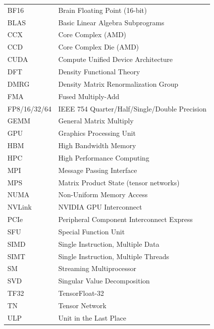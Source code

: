 \begin{tabular}{@{}ll@{}}
  BF16       & Brain Floating Point (16-bit) \\
  BLAS       & Basic Linear Algebra Subprograms \\
  CCX        & Core Complex (AMD) \\
  CCD        & Core Complex Die (AMD) \\
  CUDA       & Compute Unified Device Architecture \\
  DFT        & Density Functional Theory \\
  DMRG       & Density Matrix Renormalization Group \\
  FMA        & Fused Multiply-Add \\
  FP8/16/32/64 & IEEE 754 Quarter/Half/Single/Double Precision \\
  GEMM       & General Matrix Multiply \\
  GPU        & Graphics Processing Unit \\
  HBM        & High Bandwidth Memory \\
  HPC        & High Performance Computing \\
  MPI        & Message Passing Interface \\
  MPS        & Matrix Product State (tensor networks) \\
  NUMA       & Non-Uniform Memory Access \\
  NVLink     & NVIDIA GPU Interconnect \\
  PCIe       & Peripheral Component Interconnect Express \\
  SFU        & Special Function Unit \\
  SIMD       & Single Instruction, Multiple Data \\
  SIMT       & Single Instruction, Multiple Threads \\
  SM         & Streaming Multiprocessor \\
  SVD        & Singular Value Decomposition \\
  TF32       & TensorFloat-32 \\
  TN         & Tensor Network \\
  ULP        & Unit in the Last Place \\
\end{tabular}
